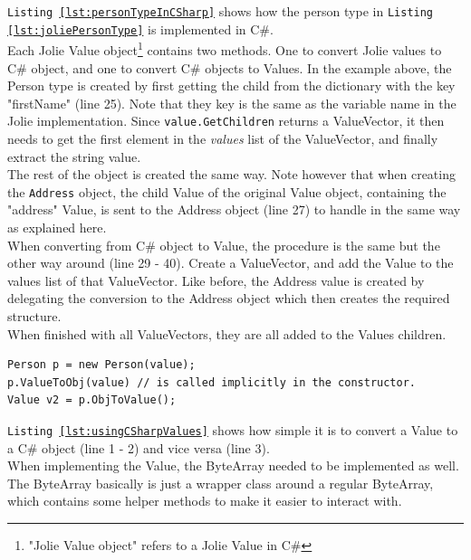 \documentclass[12pt,a4paper]{article}
\begin{document}
\texttt{Listing \ref{lst:personTypeInCSharp}} shows how the person type in \texttt{Listing \ref{lst:joliePersonType}} is implemented in C\#. \\
Each Jolie Value object\footnote{"Jolie Value object" refers to a Jolie Value in C\#} contains two methods. One to convert Jolie values to C\# object, and one to convert C\# objects to Values. In the example above, the Person type is created by first getting the child from the dictionary with the key "firstName" (line 25). Note that they key is the same as the variable name in the Jolie implementation. Since \texttt{value.GetChildren} returns a ValueVector, it then needs to get the first element in the \emph{values} list of the ValueVector, and finally extract the string value.\\
The rest of the object is created the same way. Note however that when creating the \texttt{Address} object, the child Value of the original Value object, containing the "address" Value, is sent to the Address object (line 27) to handle in the same way as explained here. \\

When converting from C\# object to Value, the procedure is the same but the other way around (line 29 - 40).
Create a ValueVector, and add the Value to the values list of that ValueVector. Like before, the Address value is created by delegating the conversion to the Address object which then creates the required structure.\\
When finished with all ValueVectors, they are all added to the Values children.

\begin{lstlisting}[caption={Using C\# Values},label={lst:usingCSharpValues}]
Person p = new Person(value);
p.ValueToObj(value) // is called implicitly in the constructor.
Value v2 = p.ObjToValue();
\end{lstlisting}

\texttt{Listing \ref{lst:usingCSharpValues}} shows how simple it is to convert a Value to a C\# object (line 1 - 2) and vice versa (line 3).\\

When implementing the Value, the ByteArray needed to be implemented as well. The ByteArray basically is just a wrapper class around a regular ByteArray, which contains some helper methods to make it easier to interact with. \\
\end{document}
